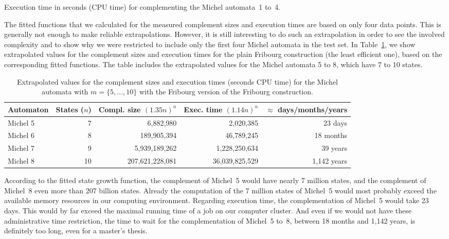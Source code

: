 \begin{table}[htb!]
\centering

\caption{Execution time in seconds (CPU time) for complementing the Michel automata~1 to~4.}
\label{i.m.times}
\end{table}

The fitted functions that we calculated for the measured complement sizes and execution times are based on only four data points. This is generally not enough to make reliable extrapolations. However, it is still interesting to do such an extrapolation in order to see the involved complexity and to show why we were restricted to include only the first four Michel automata in the test set. In Table~\ref{i.m.extrapolation}, we show extrapolated values for the complement sizes and execution times for the plain Fribourg construction (the least efficient one), based on the corresponding fitted functions. The table includes the extrapolated values for the Michel automata 5 to 8, which have 7 to 10 states. 


\begin{table}[htb]
\centering
\begin{tabular}{lrrrr}
\hline
Automaton & States ($n$) & Compl. size $(1.35n)^n$ & Exec. time $(1.14n)^n$ & $\approx$ days/months/years \\
\hline
Michel 5 &  7 &       6,882,980 &      2,020,385 &     23 days   \\
Michel 6 &  8 &     189,905,394 &     46,789,245 &     18 months \\
Michel 7 &  9 &   5,939,189,262 &  1,228,250,634 &     39 years  \\
Michel 8 & 10 & 207,621,228,081 & 36,039,825,529 &  1,142 years  \\
\hline
\end{tabular}
\caption{Extrapolated values for the complement sizes and execution times (seconds CPU time)  for the Michel automata with $m=\{5,\dots,10\}$ with the Fribourg version of the Fribourg construction.}
\label{i.m.extrapolation}
\end{table}

According to the fitted state growth function, the complement of Michel~5 would have nearly 7 million states, and the complement of Michel~8 even more than 207 billion states. Already the computation of the 7 million states of Michel~5 would most probably exceed the available memory resources in our computing environment. Regarding execution time, the complementation of Michel~5 would take 23 days. This would by far exceed the maximal running time of a job on our computer cluster. And even if we would not have these administrative time restriction, the time to wait for the complementation of Michel~5 to~8, between 18 months and 1,142 years, is definitely too long, even for a master's thesis.


